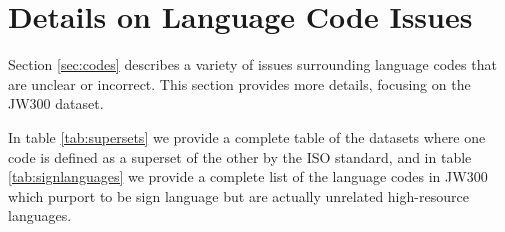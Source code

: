 





\section{Details on Language Code Issues}
\label{app:jw300}

Section \ref{sec:codes} describes a variety of issues surrounding language codes that are unclear or incorrect. This section provides more details, focusing on the JW300 dataset.

In table \ref{tab:supersets} we provide a complete table of the datasets where one code is defined as a superset of the other by the ISO standard, and in table \ref{tab:signlanguages} we provide a complete list of the language codes in JW300 which purport to be sign language but are actually unrelated high-resource languages.

